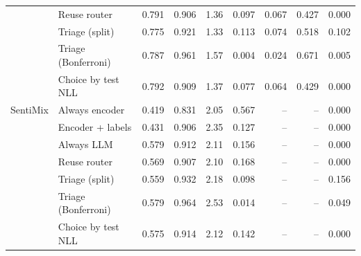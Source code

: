 \begin{table}[t]
{\begin{tabular}{llrrrrrrr}
 & Reuse router & 0.791 & 0.906 & 1.36 & 0.097 & 0.067 & 0.427 & 0.000 \\
 & Triage (split) & 0.775 & 0.921 & 1.33 & 0.113 & 0.074 & 0.518 & 0.102 \\
 & Triage (Bonferroni) & 0.787 & 0.961 & 1.57 & 0.004 & 0.024 & 0.671 & 0.005 \\
 & Choice by test NLL & 0.792 & 0.909 & 1.37 & 0.077 & 0.064 & 0.429 & 0.000 \\
\midrule
SentiMix & Always encoder & 0.419 & 0.831 & 2.05 & 0.567 & -- & -- & 0.000 \\
 & Encoder + labels & 0.431 & 0.906 & 2.35 & 0.127 & -- & -- & 0.000 \\
 & Always LLM & 0.579 & 0.912 & 2.11 & 0.156 & -- & -- & 0.000 \\
 & Reuse router & 0.569 & 0.907 & 2.10 & 0.168 & -- & -- & 0.000 \\
 & Triage (split) & 0.559 & 0.932 & 2.18 & 0.098 & -- & -- & 0.156 \\
 & Triage (Bonferroni) & 0.579 & 0.964 & 2.53 & 0.014 & -- & -- & 0.049 \\
 & Choice by test NLL & 0.575 & 0.914 & 2.12 & 0.142 & -- & -- & 0.000 \\
\bottomrule
\end{tabular}
}
\end{table}
